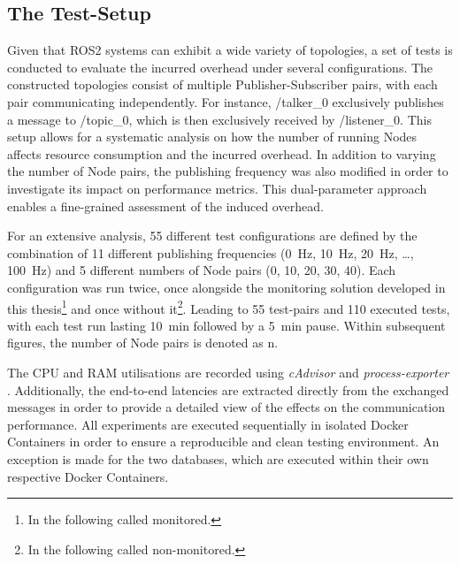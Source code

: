    \subsection{The Test-Setup} \label{subsec:evaluation:testSetup}
    Given that ROS2 systems can exhibit a wide variety of topologies, a set of tests is conducted to evaluate the incurred overhead under several configurations. The constructed topologies consist of multiple Publisher-Subscriber pairs, with each pair communicating independently. For instance, \glqq{}/talker\_0\grqq{} exclusively publishes a message to \glqq{}/topic\_0\grqq{}, which is then exclusively received by \glqq{}/listener\_0\grqq{}. This setup allows for a systematic analysis on how the number of running Nodes affects resource consumption and the incurred overhead.\newline
    In addition to varying the number of Node pairs, the publishing frequency was also modified in order to investigate its impact on performance metrics. This dual-parameter approach enables a fine-grained assessment of the induced overhead.

    For an extensive analysis, 55 different test configurations are defined by the combination of 11 different publishing frequencies (0~Hz, 10~Hz, 20~Hz, \ldots, 100~Hz) and 5 different numbers of Node pairs (0, 10, 20, 30, 40). Each configuration was run twice, once alongside the monitoring solution developed in this thesis\footnote{In the following called \glqq{}monitored\grqq{}.} and once without it\footnote{In the following called \glqq{}non-monitored\grqq{}.}. Leading to 55 test-pairs and 110 executed tests, with each test run lasting 10~min followed by a 5~min pause. Within subsequent figures, the number of Node pairs is denoted as \glqq{}n\grqq{}.

    The CPU and RAM utilisations are recorded using \emph{cAdvisor} \cite{github:cadvisor} and \emph{process-exporter} \cite{github:processExporter}. Additionally, the end-to-end latencies are extracted directly from the exchanged messages in order to provide a detailed view of the effects on the communication performance.\newline
    All experiments are executed sequentially in isolated Docker Containers \cite{website:docker} in order to ensure a reproducible and clean testing environment. An exception is made for the two databases, which are executed within their own respective Docker Containers.
    
